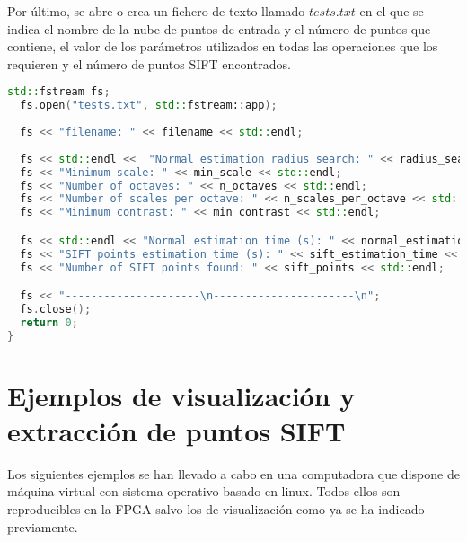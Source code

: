  Por último, se abre o crea un fichero de texto llamado $tests.txt$ en el que se indica el nombre de la nube de puntos de entrada y el número de puntos que contiene, el valor de los parámetros utilizados en todas las operaciones que los requieren y el número de puntos SIFT encontrados.
 
\begin{lstlisting}[language=C++,breaklines]
  std::fstream fs;
  fs.open("tests.txt", std::fstream::app);
  
  fs << "filename: " << filename << std::endl;
  
  fs << std::endl <<  "Normal estimation radius search: " << radius_search << std::endl; 
  fs << "Minimum scale: " << min_scale << std::endl;
  fs << "Number of octaves: " << n_octaves << std::endl;
  fs << "Number of scales per octave: " << n_scales_per_octave << std::endl;
  fs << "Minimum contrast: " << min_contrast << std::endl;

  fs << std::endl << "Normal estimation time (s): " << normal_estimation_time << std::endl;
  fs << "SIFT points estimation time (s): " << sift_estimation_time << std::endl;
  fs << "Number of SIFT points found: " << sift_points << std::endl;

  fs << "---------------------\n----------------------\n";
  fs.close();
  return 0;
}
\end{lstlisting}


\section{Ejemplos de visualización y extracción de puntos SIFT}
Los siguientes ejemplos se han llevado a cabo en una computadora que dispone de máquina virtual con sistema operativo basado en linux. Todos ellos son reproducibles en la FPGA salvo los de visualización como ya se ha indicado previamente.


